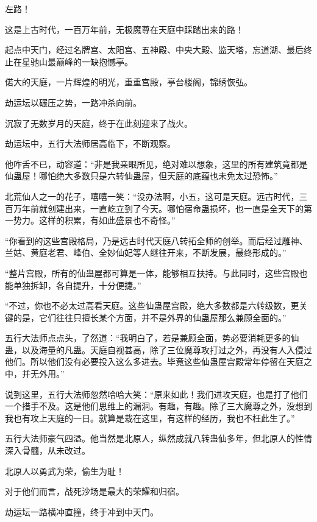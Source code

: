 
\begin{this_body}

左路！

这是上古时代，一百万年前，无极魔尊在天庭中踩踏出来的路！

起点中天门，经过名牌宫、太阳宫、五神殿、中央大殿、监天塔，忘道湖、最后终止在星驰山最巅峰的一缺抱憾亭。

偌大的天庭，一片辉煌的明光，重重宫殿，亭台楼阁，锦绣恢弘。

劫运坛以碾压之势，一路冲杀向前。

沉寂了无数岁月的天庭，终于在此刻迎来了战火。

劫运坛中，五行大法师居高临下，不断观察。

他咋舌不已，动容道：“非是我亲眼所见，绝对难以想象，这里的所有建筑竟都是仙蛊屋！哪怕绝大多数只是六转仙蛊屋，但天庭的底蕴也未免太过恐怖。”

北荒仙人之一的花子，嘻嘻一笑：“没办法啊，小五，这可是天庭。远古时代，三百万年前就创建出来，一直屹立到了今天。哪怕宿命蛊损坏，也一直是全天下的第一势力。这样的积累，有如此盛景也不奇怪。”

“你看到的这些宫殿格局，乃是远古时代天庭八转拓全师的创举。而后经过雕神、兰姑、黄庭老君、峰伯、全妙仙妃等人继往开来，不断发展，最终形成的。”

“整片宫殿，所有的仙蛊屋都可算是一体，能够相互扶持。与此同时，这些宫殿也能单独拆卸，各自提升，十分便捷。”

“不过，你也不必太过高看天庭。这些仙蛊屋宫殿，绝大多数都是六转级数，更关键的是，它们往往只擅长某个方面，并不是外界的仙蛊屋那么兼顾全面的。”

五行大法师点点头，了然道：“我明白了，若是兼顾全面，势必要消耗更多的仙蛊，以及海量的凡蛊。天庭自视甚高，除了三位魔尊攻打过之外，再没有人入侵过他们。所以他们没有必要投入这么多进去。毕竟这些仙蛊屋宫殿常年停留在天庭之中，并无外用。”

说到这里，五行大法师忽然哈哈大笑：“原来如此！我们进攻天庭，也是打了他们一个措手不及。这是他们思维上的漏洞。有趣，有趣。除了三大魔尊之外，没想到我也有攻上天庭的一日。就算是栽在这里，有这样的经历，我也不枉此生了。”

五行大法师豪气四溢。他当然是北原人，纵然成就八转蛊仙多年，但北原人的性情深入骨髓，从未改过。

北原人以勇武为荣，偷生为耻！

对于他们而言，战死沙场是最大的荣耀和归宿。

劫运坛一路横冲直撞，终于冲到中天门。


\end{this_body}
